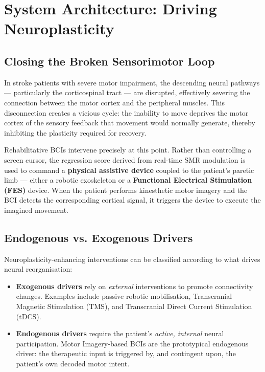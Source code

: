 \documentclass[10pt, letterpaper]{report}
\begin{document}

\section{System Architecture: Driving Neuroplasticity}

\subsection{Closing the Broken Sensorimotor Loop}

In stroke patients with severe motor impairment, the descending neural pathways —
particularly the corticospinal tract — are disrupted, effectively severing the connection
between the motor cortex and the peripheral muscles. This disconnection creates a vicious
cycle: the inability to move deprives the motor cortex of the sensory feedback that
movement would normally generate, thereby inhibiting the plasticity required for recovery.

Rehabilitative BCIs intervene precisely at this point. Rather than controlling a screen
cursor, the regression score derived from real-time SMR modulation is used to command a
\textbf{physical assistive device} coupled to the patient's paretic limb — either a
robotic exoskeleton or a \textbf{Functional Electrical Stimulation (FES)} device. When
the patient performs kinesthetic motor imagery and the BCI detects the corresponding
cortical signal, it triggers the device to execute the imagined movement.

\subsection{Endogenous vs. Exogenous Drivers}

Neuroplasticity-enhancing interventions can be classified according to what drives neural
reorganisation:

\begin{itemize}
  \item \textbf{Exogenous drivers} rely on \emph{external} interventions to promote
  connectivity changes. Examples include passive robotic mobilisation, Transcranial
  Magnetic Stimulation (TMS), and Transcranial Direct Current Stimulation (tDCS).

  \item \textbf{Endogenous drivers} require the patient's \emph{active, internal} neural
  participation. Motor Imagery-based BCIs are the prototypical endogenous driver: the
  therapeutic input is triggered by, and contingent upon, the patient's own decoded
  motor intent.
\end{itemize}
\end{document}
